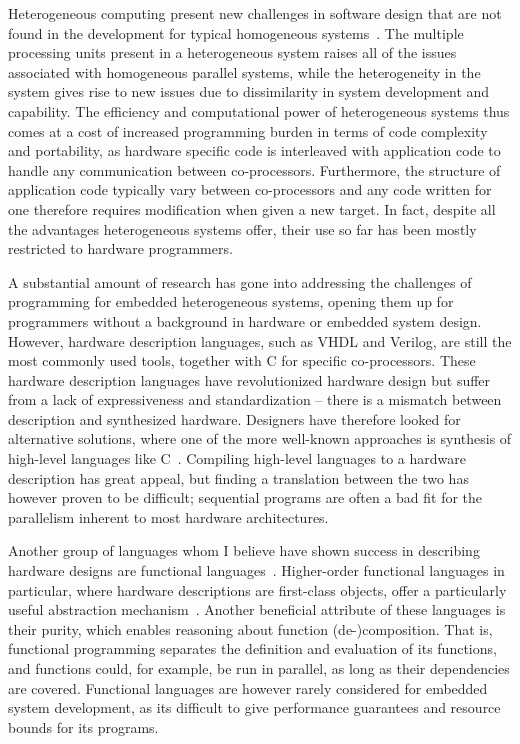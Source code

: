 Heterogeneous computing present new challenges in software design that are not found in the development for typical homogeneous systems~\cite{kunzman2011}. The multiple processing units present in a heterogeneous system raises all of the issues associated with homogeneous parallel systems, while the heterogeneity in the system gives rise to new issues due to  dissimilarity in system development and capability. The efficiency and computational power of heterogeneous systems thus comes at a cost of increased programming burden in terms of code complexity and portability, as hardware specific code is interleaved with application code to handle any communication between co-processors. Furthermore, the structure of application code typically vary between co-processors and any code written for one therefore requires modification when given a new target. In fact, despite all the advantages heterogeneous systems offer, their use so far has been mostly restricted to hardware programmers.

A substantial amount of research has gone into addressing the challenges of programming for embedded heterogeneous systems, opening them up for programmers without a background in hardware or embedded system design. However, hardware description languages, such as VHDL and Verilog, are still the most commonly used tools, together with C for specific co-processors. These hardware description languages have revolutionized hardware design but suffer from a lack of expressiveness and standardization -- there is a mismatch between description and synthesized hardware. Designers have therefore looked for alternative solutions, where one of the more well-known approaches is synthesis of high-level languages like C~\cite{graphics2008, ghenassia2005}. Compiling high-level languages to a hardware description has great appeal, but finding a translation between the two has however proven to be difficult; sequential programs are often a bad fit for the parallelism inherent to most hardware architectures.

Another group of languages whom I believe have shown success in describing hardware designs are functional languages~\cite{sheeran2005}. Higher-order functional languages in particular, where hardware descriptions are first-class objects, offer a particularly useful abstraction mechanism~\cite{baaij2010, bjesse1998, gill2010}. Another beneficial attribute of these languages is their purity, which enables reasoning about function (de-)composition. That is, functional programming separates the definition and evaluation of its functions, and functions could, for example, be run in parallel, as long as their dependencies are covered. Functional languages are however rarely considered for embedded system development, as its difficult to give performance guarantees and resource bounds for its programs.

